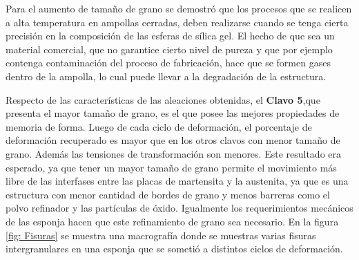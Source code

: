 \documentclass[a4paper,12pt,fleqn,twoside,openany]{book}
\begin{document}
Para el aumento de tamaño de grano se demostró que los procesos que se realicen a alta temperatura en ampollas cerradas, deben realizarse cuando se tenga cierta precisión en la composición de las esferas de sílica gel. El hecho de que sea un material comercial, que no garantice cierto nivel de pureza y que por ejemplo contenga contaminación del proceso de fabricación, hace que se formen gases dentro de la ampolla, lo cual puede llevar a la degradación de la estructura. 

Respecto de las características de las aleaciones obtenidas, el \textbf{Clavo 5},que presenta el mayor tamaño de grano, es el que posee las mejores propiedades de memoria de forma. Luego de cada ciclo de deformación, el porcentaje de deformación recuperado es mayor que en los otros clavos con menor tamaño de grano. Además las tensiones de transformación son menores. Este resultado era esperado, ya que tener un mayor tamaño de grano permite el movimiento más libre de las interfases entre las placas de martensita y la austenita, ya que es una estructura con menor cantidad de bordes de grano y menos barreras como el polvo refinador y las partículas de óxido. Igualmente los requerimientos mecánicos de las esponja hacen que este refinamiento de grano sea necesario. En la figura \ref{fig: Fisuras} se muestra una macrografía donde se muestras varias fisuras intergranulares en una esponja que se sometió a distintos ciclos de deformación.

 
\end{document}
